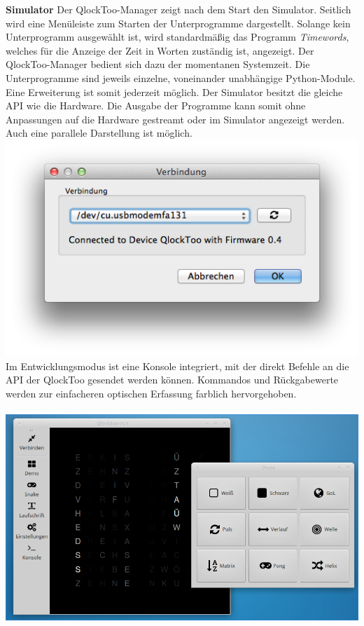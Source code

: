 \begin{multicols}{2}
\textbf{Simulator}
Der QlockToo-Manager zeigt nach dem Start den Simulator. Seitlich wird eine Menüleiste zum Starten der Unterprogramme dargestellt.
Solange kein Unterprogramm ausgewählt ist, wird standardmäßig das Programm \emph{Timewords}, welches für die Anzeige der Zeit in Worten zuständig ist, angezeigt. Der QlockToo-Manager bedient sich dazu der momentanen Systemzeit.
Die Unterprogramme sind jeweils einzelne, voneinander unabhängige Python-Module. Eine Erweiterung ist somit jederzeit möglich.
Der Simulator besitzt die gleiche API wie die Hardware. Die Ausgabe der Programme kann somit ohne Anpassungen auf die Hardware gestreamt oder im Simulator angezeigt werden. Auch eine parallele Darstellung ist möglich.
\includegraphics[width=\columnwidth]{Abbildungen/Software/ConnectDialog}
Im Entwicklungsmodus ist eine Konsole integriert, mit der direkt Befehle an die API der QlockToo gesendet werden können. Kommandos und Rückgabewerte werden zur einfacheren optischen Erfassung farblich hervorgehoben. \\ \\
\includegraphics[width=\columnwidth]{Abbildungen/Software/Linux}


\end{multicols}
